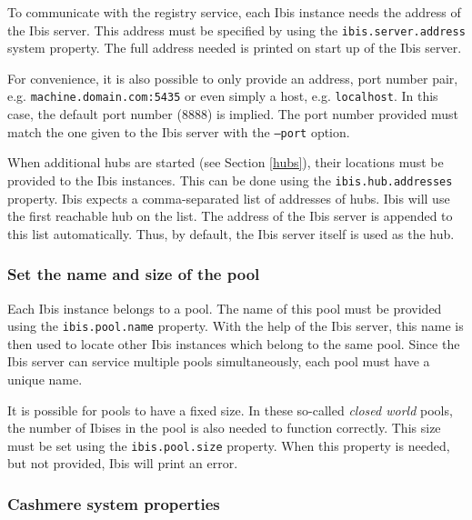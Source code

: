 \documentclass[a4paper,10pt]{article}
\begin{document}
To communicate with the registry service, each Ibis instance needs the address
of the Ibis server. This address must be specified by using the
\texttt{ibis.server.address} system property. The full address needed is
printed on start up of the Ibis server.

For convenience, it is also possible to only provide an address, port number
pair, e.g. \texttt{machine.domain.com:5435} or even simply a host, e.g.
\texttt{localhost}. In this case, the default port number (8888) is implied.
The port number provided must match the one given to the Ibis server
with the \texttt{--port} option.

When additional hubs are started (see Section \ref{hubs}), their locations
must be provided to the Ibis instances. This can be done using
the \texttt{ibis.hub.addresses} property. Ibis expects a comma-separated
list of addresses of hubs. Ibis will use the first reachable hub on the
list. The address of the Ibis server is appended to this list
automatically. Thus, by default, the Ibis server itself is used as the
hub.

\subsubsection{Set the name and size of the pool}

Each Ibis instance belongs to a pool. The name of this pool must be provided
using the \texttt{ibis.pool.name} property. With the help of the Ibis server,
this name is then used to locate other Ibis instances which belong to the
same pool. Since the Ibis server can service multiple pools simultaneously,
each pool must have a unique name.

It is possible for pools to have a fixed size. In these so-called \emph{closed
world} pools, the number of Ibises in the pool is also needed to function
correctly. This size must be set using the \texttt{ibis.pool.size} property.
When this property is needed, but not provided, Ibis will print an error. 

\subsubsection{Cashmere system properties}
\end{document}
